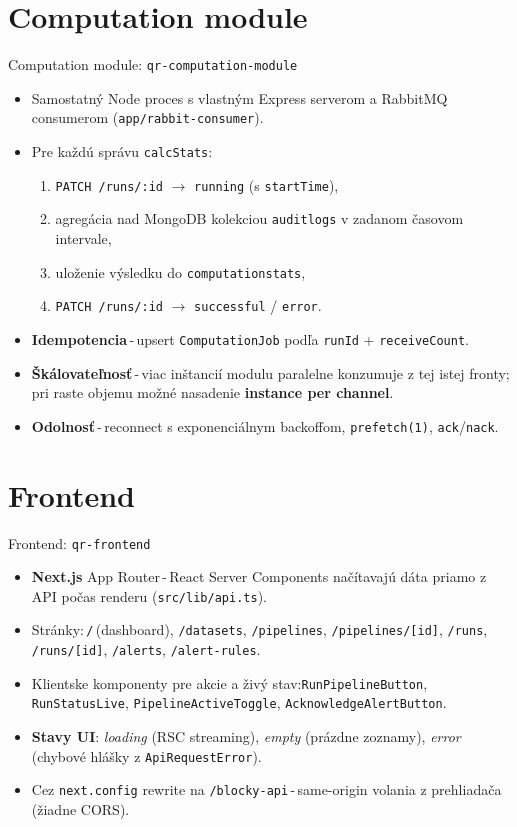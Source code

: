 \documentclass[aspectratio=169,11pt]{beamer}
\begin{document}
\section{Computation module}
\begin{frame}{Computation module: \texttt{qr-computation-module}}
  \begin{itemize}
    \item Samostatný Node proces s vlastným Express serverom a RabbitMQ consumerom (\texttt{app/rabbit-consumer}).
    \item Pre každú správu \texttt{calcStats}:
      \begin{enumerate}\small
        \item \texttt{PATCH /runs/:id} $\to$ \texttt{running} (s \texttt{startTime}),
        \item agregácia nad MongoDB kolekciou \texttt{auditlogs} v zadanom časovom intervale,
        \item uloženie výsledku do \texttt{computationstats},
        \item \texttt{PATCH /runs/:id} $\to$ \texttt{successful} / \texttt{error}.
      \end{enumerate}
    \item \textbf{Idempotencia}\,-\,upsert \texttt{ComputationJob} podľa \texttt{runId} + \texttt{receiveCount}.
    \item \textbf{Škálovateľnosť}\,-\,viac inštancií modulu paralelne konzumuje z tej istej fronty; pri raste objemu možné nasadenie \textbf{instance per channel}.
    \item \textbf{Odolnosť}\,-\,reconnect s exponenciálnym backoffom, \texttt{prefetch(1)}, \texttt{ack}/\texttt{nack}.
  \end{itemize}
\end{frame}

\section{Frontend}
\begin{frame}{Frontend: \texttt{qr-frontend}}
  \begin{itemize}
    \item \textbf{Next.js} App Router\,-\,React Server Components načítavajú dáta priamo z API počas renderu (\texttt{src/lib/api.ts}).
    \item Stránky:\,\texttt{/}\,(dashboard), \texttt{/datasets}, \texttt{/pipelines}, \texttt{/pipelines/[id]}, \texttt{/runs}, \texttt{/runs/[id]}, \texttt{/alerts}, \texttt{/alert-rules}.
    \item Klientske komponenty pre akcie a živý stav:\;\texttt{RunPipelineButton}, \texttt{RunStatusLive}, \texttt{PipelineActiveToggle}, \texttt{AcknowledgeAlertButton}.
    \item \textbf{Stavy UI}: \textit{loading} (RSC streaming), \textit{empty} (prázdne zoznamy), \textit{error} (chybové hlášky z \texttt{ApiRequestError}).
    \item Cez \texttt{next.config} rewrite na \texttt{/blocky-api}\,-\,same-origin volania z prehliadača (žiadne CORS).
  \end{itemize}
\end{frame}
\end{document}
